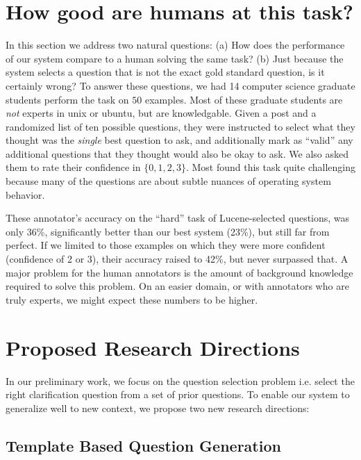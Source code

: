 \documentclass[11pt,a4paper]{article}
\begin{document}
\section{How good are humans at this task?}

In this section we address two natural questions:
(a) How does the performance of our system compare to a human solving the same task?
(b) Just because the system selects a question that is not the exact gold standard question, is it certainly wrong?
To answer these questions, we had 14 computer science graduate students perform the task on $50$ examples.
Most of these graduate students are \emph{not} experts in unix or ubuntu, but are knowledgable.
Given a post and a randomized list of ten possible questions, they were instructed to select what they thought was the \emph{single} best question to ask, and additionally mark as ``valid'' any additional questions that they thought would also be okay to ask.
We also asked them to rate their confidence in $\{0,1,2,3\}$.
Most found this task quite challenging because many of the questions are about subtle nuances of operating system behavior.

These annotator's accuracy on the ``hard'' task of Lucene-selected questions, was only 36\%, significantly better than our best system (23\%), but still far from perfect.
If we limited to those examples on which they were more confident (confidence of 2 or 3), their accuracy raised to 42\%, but never surpassed that.
A major problem for the human annotators is the amount of background knowledge required to solve this problem.
On an easier domain, or with annotators who are truly experts, we might expect these numbers to be higher.

\section{Proposed Research Directions}

In our preliminary work, we focus on the question selection problem i.e. select the right clarification question from a set of prior questions.
To enable our system to generalize well to new context, we propose two new research directions:

\subsection{Template Based Question Generation}
\end{document}
